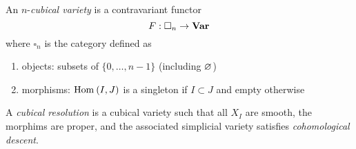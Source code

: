 \documentclass[12pt]{article}
\begin{document}
\begin{defn}
An $n$-\textit{cubical variety} is a contravariant functor 
\[ F : \square_n \to \mathbf{Var} \]
where $\square_n$ is the category defined as
\begin{enumerate}
\item objects: subsets of $\{ 0, \dots, n - 1\}$ (including $\varnothing$)
\item morphisms: $\mathrm{Hom}_{} \left( I, J \right)$ is a singleton if $I \subset J$ and empty otherwise
\end{enumerate}
\end{defn}

\begin{defn}
A \textit{cubical resolution} is a cubical variety such that all $X_I$ are smooth, the morphims are proper, and the associated simplicial variety satisfies \textit{cohomological descent}. 
\end{defn}
\end{document}
